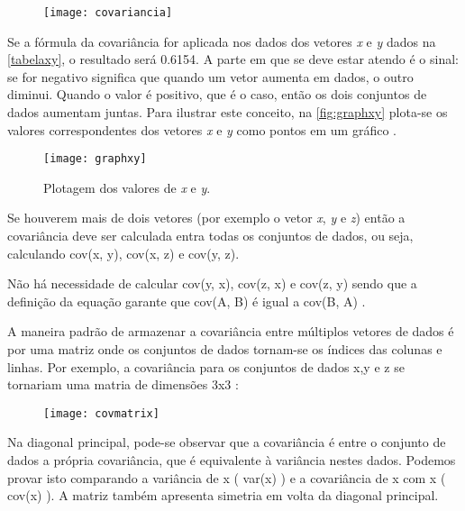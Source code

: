 \begin{figure}[h]
	\centering
	\texttt{[image: covariancia]}
	\label{fig:variancia}
\end{figure}

Se a fórmula da covariância for aplicada nos dados dos vetores \textit{x} e \textit{y} dados na \autoref{tabelaxy}, o resultado será 0.6154. A parte em que se deve estar atendo é o sinal: se for negativo significa que quando um vetor aumenta em dados, o outro diminui. Quando o valor é positivo, que é o caso, então os dois conjuntos de dados aumentam juntas. Para ilustrar este conceito, na \autoref{fig:graphxy} plota-se os valores correspondentes dos vetores \textit{x} e \textit{y} como pontos em um gráfico \cite{drmathew_java_programming}.


\begin{figure}[h]
	\centering
	\texttt{[image: graphxy]}
	\caption{Plotagem dos valores de \textit{x} e \textit{y}.}
	\label{fig:graphxy}
\end{figure}

Se houverem mais de dois vetores (por exemplo o vetor \textit{x}, \textit{y} e \textit{z}) então a covariância deve ser calculada entra todas os conjuntos de dados, ou seja, calculando cov(x, y), cov(x, z) e cov(y, z). 

Não há necessidade de calcular cov(y, x), cov(z, x) e cov(z, y) sendo que a definição da equação garante que cov(A, B) é igual a cov(B, A) .

A maneira padrão de armazenar a covariância entre múltiplos vetores de dados é por uma matriz onde os conjuntos de dados tornam-se os índices das colunas e linhas. Por exemplo, a covariância para os conjuntos de dados x,y e z se tornariam uma matria de dimensões 3x3 \cite{drmathew_java_programming}:

\begin{figure}[h]
	\centering
	\texttt{[image: covmatrix]}
	\label{fig:covmatrix}
\end{figure}

Na diagonal principal, pode-se observar que a covariância é entre o conjunto de dados a própria covariância, que é equivalente à variância nestes dados. Podemos provar isto comparando a variância de x ( var(x) ) e a covariância de x com x ( cov(x) ). A matriz também apresenta simetria em volta da diagonal principal. 

